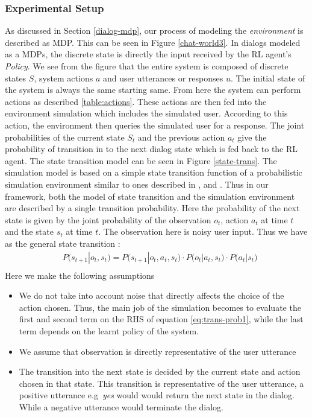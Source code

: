 \documentclass[12pt]{extarticle}
\numberwithin{equation}{section}
\begin{document}
	\subsubsection{Experimental Setup}\label{expt-setup}
	As discussed in Section \ref{dialog-mdp}, our process of modeling the \textit{environment} is described as MDP. This can be seen in Figure \ref{chat-world3}. In dialogs modeled as a MDPs, the discrete state is directly the input received by the RL agent's \textit{Policy}. We see from the figure that the entire system is composed of discrete states $S$, system actions $a$ and user utterances or responses $u$. The initial state of the system is always the same starting same. From here the system can perform actions as described \ref{table:actions}. These actions are then fed into the environment simulation which includes the simulated user. According to this action, the environment then queries the simulated user for a response. The joint probabilities of the current state $S_t$	and the previous action $a_t$ give the probability of transition in to the next dialog state which is fed back to the RL agent. The state transition model can be seen in Figure \ref{state-trans}. The simulation model is based on a simple state transition function of a probabilistic simulation environment similar to ones described in \cite{Singh_mdp}, \cite{walker2000evaluation} and \cite{roy2000spoken}. Thus in our framework, both the model of state transition and the simulation environment are described by a single transition probability. Here the probability of the next state is given by the joint probability of the observation $o_t$, action $a_t$ at time $t$ and the state $s_{t}$ at time $t$. The observation here is noisy user input. Thus we have as the general state transition :
	\begin{align}\label{eq:trans-prob1}
&P\big(s_{t+1}|o_t ,s_t\big) = P\big(s_{t+1} | o_t,a_t,s_t \big)\cdot P\big(o_t | a_t,s_t\big)\cdot P\big(a_t | s_t\big) \nonumber\\
	\end{align}
	Here we make the following assumptions
	\begin{itemize}
		\item We do not take into account noise that directly affects the choice of the action chosen. Thus, the main job of the simulation becomes to evaluate the first and second term on the RHS of equation \ref{eq:trans-prob1}, while the last term depends on the learnt policy of the system.
		\item We assume that observation is directly representative of the user utterance
		\item The transition into the next state is decided by the current state and action chosen in that state. This transition is representative of the user utterance, a positive utterance e.g\ \textit{yes} would would return the next state in the dialog. While a negative utterance would terminate the dialog.
	\end{itemize}
\end{document}
